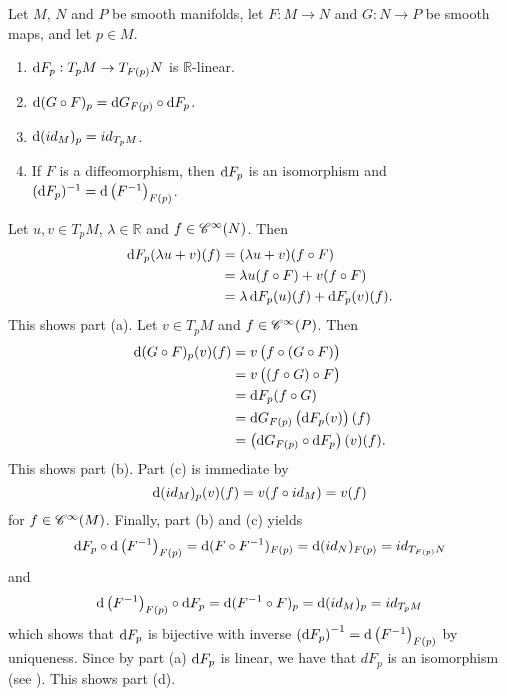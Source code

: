 \begin{exercise}
	Let $M$, $N$ and $P$ be smooth manifolds, let $F: M \to N$ and $G: N \to P$ be smooth maps, and let $p \in M$.
	\begin{enumerate}[label = (\alph*)]
		\item $\mathop{}\!\mathrm{d} F_p: T_pM \to T_{F(p)}N$ is $\mathbb{R}$-linear.
		\item $\mathop{}\!\mathrm{d} (G \circ F)_p = \mathop{}\!\mathrm{d} G_{F(p)} \circ \mathop{}\!\mathrm{d} F_p$.
		\item $\mathop{}\!\mathrm{d}(id_M)_p = id_{T_pM}$.
		\item If $F$ is a diffeomorphism, then $\mathop{}\!\mathrm{d} F_p$ is an isomorphism and $(\d F_p)^{-1} = \d \del[1]{F^{-1}}_{F(p)}$.
	\end{enumerate}
\end{exercise}

\begin{solution}
	Let $u,v \in T_pM$, $\lambda \in \mathbb{R}$ and $f \in \mathscr{C}^\infty(N)$. Then
	\begin{align*}
		\mathop{}\!\mathrm{d} F_p(\lambda u + v)(f) &= (\lambda u + v)(f \circ F)\\
		&= \lambda u(f \circ F) + v(f \circ F)\\
		&= \lambda\mathop{}\!\mathrm{d} F_p(u)(f) + \mathop{}\!\mathrm{d} F_p(v)(f).
	\end{align*}
	This shows part (a). Let $v \in T_pM$ and $f \in \mathscr{C}^\infty(P)$. Then
	\begin{align*}
		\d (G \circ F)_p(v)(f) &= v\del[1]{f \circ (G \circ F)}\\
		&= v\del[1]{(f \circ G) \circ F}\\
		&= \d F_p (f \circ G)\\
		&= \d G_{F(p)}\del[1]{\d F_p(v)}(f)\\
		&= \del[1]{\d G_{F(p)} \circ \d F_p}(v)(f).
	\end{align*}
	This shows part (b). Part (c) is immediate by
	\begin{equation*}
		\mathop{}\!\mathrm{d} (id_M)_p(v)(f) = v(f \circ id_M) = v(f)
	\end{equation*}
	\noindent for $f \in \mathscr{C}^\infty(M)$. Finally, part (b) and (c) yields
	\begin{equation*}
		\d F_p \circ \d \del[1]{F^{-1}}_{F(p)} = \d(F \circ F^{-1})_{F(p)} = \d(id_N)_{F(p)} = id_{T_{F(p)}N}
	\end{equation*}
	\noindent and
	\begin{equation*}
		\d \del[1]{F^{-1}}_{F(p)} \circ \d F_p = \d(F^{-1} \circ F)_p = \d (id_M)_p = id_{T_pM}
	\end{equation*}
	\noindent which shows that $\mathop{}\!\mathrm{d} F_p$ is bijective with inverse $\del[0]{\d F_p}^{-1} = \d \del[1]{F^{-1}}_{F(p)}$ by uniqueness. Since by part (a) $\mathop{}\!\mathrm{d} F_p$ is linear, we have that $dF_p$ is an isomorphism (see \cite[622]{lee:smooth_manifolds:2013}). This shows part (d).
\end{solution}
